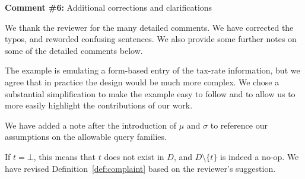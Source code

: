 
\noindent
\textbf{Comment \#6:} Additional corrections and clarifications

\smallskip

We thank the reviewer for the many detailed comments. We have corrected the
typos, and reworded confusing sentences. We also provide some further notes on
some of the detailed comments below.

\begin{quote}
\end{quote}

The example is emulating a form-based entry of the tax-rate information, but
we agree that in practice the design would be much more complex. We chose a
substantial simplification to make the example easy to follow and to allow us
to more easily highlight the contributions of our work.

% 


\begin{quote}
\end{quote}

We have added a note after the introduction of $\mu$ and $\sigma$ to reference our
assumptions on the allowable query families.


\begin{quote}
\end{quote}

If $t = \bot$, this means that $t$ does not exist in $D$, and $D
\setminus\{t\}$ is indeed a no-op. We have revised
Definition~\ref{def:complaint} based on the reviewer's suggestion.


